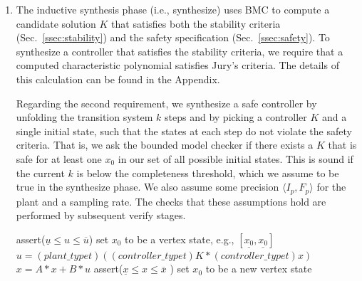 \documentclass[runningheads,a4paper]{llncs}
\begin{document}
\begin{enumerate}

\item The inductive synthesis phase (i.e., {\sc synthesize}) uses BMC to
compute a candidate solution $K$ that satisfies both the stability criteria
(Sec.~\ref{ssec:stability}) and the safety specification
(Sec.~\ref{ssec:safety}).  To synthesize a controller that satisfies the
stability criteria, we require that a computed characteristic polynomial
satisfies Jury's criteria.  The details of this calculation can be found in
the Appendix.


Regarding the second requirement, we synthesize a safe controller by
unfolding the transition system $k$ steps and by picking a controller $K$
and a single initial state, such that the states at each step do not violate
the safety criteria.  That is, we ask the bounded model checker if there
exists a $K$ that is safe for at least one $x_0$ in our set of all possible
initial states.  This is sound if the current $k$ is below the completeness
threshold, which we assume to be true in the {\sc synthesize} phase.  We
also assume some precision $\langle I_p,F_p\rangle$ for the plant and a
sampling rate.  The checks that these assumptions hold are performed by
subsequent {\sc verify} stages.



\begin{algorithm}[]
\scriptsize
\begin{algorithmic}[1]
\State assert($ \underline{u}  \leq u \leq \overline{u}$)
 \State set $x_0$ to be a vertex state, e.g., $[\underline{x_0},\underline{x_0}]$	
		\State $u = (plant\_typet)((controller\_typet)K * (controller\_typet) x)$
		\State $x = A * x + B * u$
		\State assert($\underline{x} \leq x \leq \overline{x}$ )
  	\EndWhile
  	\State set $x_0$ to be a new vertex state
  	\EndFor
\EndFunction
\end{algorithmic}
\label{alg:safetycheck}
\end{algorithm}


\end{enumerate}
\end{document}
